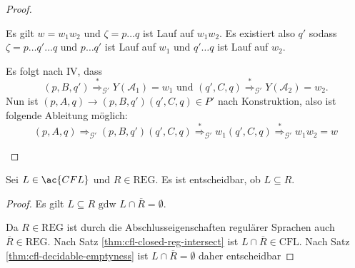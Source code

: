 {\begin{proof}
\begin{itemize}
\begin{description}
\begin{itemize}
          Es gilt $w = w_1w_2$ und $\zeta = p\ldots q$ ist Lauf auf $w_1w_2$.
          Es existiert also $q'$ sodass $\zeta = p\ldots q' \ldots q$ und $p\ldots q'$ ist Lauf auf $w_1$ und $q' \ldots q$ ist Lauf auf $w_2$.

          Es folgt nach IV, dass
          \begin{displaymath}
            (p, B, q') \stackrel{*}{\Longrightarrow}_{\mathcal{G}'} Y(\mathcal{A}_1) = w_1 \text{ und } (q', C, q) \stackrel{*}{\Longrightarrow}_{\mathcal{G}'} Y(\mathcal{A}_2) = w_2.
          \end{displaymath}
          Nun ist $(p,A,q) \to (p,B,q')(q',C,q) \in P'$ nach Konstruktion, also ist folgende Ableitung möglich:
          \begin{displaymath}
            (p,A,q) \Longrightarrow_{\mathcal{G}'} (p,B,q')(q',C,q) \stackrel{*}{\Longrightarrow}_{\mathcal{G}'} w_1(q',C,q) \stackrel{*}{\Longrightarrow}_{\mathcal{G}'} w_1w_2 = w
          \end{displaymath}
        \end{itemize}
    \end{description}
  \end{itemize}
  \end{proof}
%
\begin{Satz}[name={[$L\subseteq R$ entscheidbar]}] %
	Sei $L\in\ac{CFL}$ und $R\in\textrm{REG}$. Es ist entscheidbar, ob $L\subseteq R$.
\end{Satz}
\begin{proof}
  Es gilt $L\subseteq R \text{ gdw } L \cap\overline{R} = \emptyset$.

  Da $R \in \mathrm{REG}$ ist durch die Abschlusseigenschaften regulärer Sprachen auch $\overline{R} \in \mathrm{REG}$.
  Nach Satz \ref{thm:cfl-closed-reg-intersect} ist $L \cap\overline{R} \in \mathrm{CFL}$.
  Nach Satz \ref{thm:cfl-decidable-emptyness} ist $L \cap\overline{R} = \emptyset$ daher entscheidbar
\end{proof}








}

